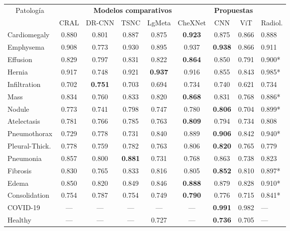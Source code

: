 \begin{table}[tb]
    \centering
    \begin{tabular}{|l||c|c|c|c|c|c|c|l|}
        \hline
        \multicolumn{1}{|c||}{Patología}	&	\multicolumn{5}{c|}{\bf Modelos comparativos}    &\multicolumn{2}{c|}{\bf Propuestas} & 	\\
        \cline{2-9}
                        &	CRAL	&	DR-CNN	&	TSNC	& LgMeta & CheXNet	& CNN	    & ViT & 	Radiol.	\\
        \hline\hline
        Cardiomegaly	&	0.880	&	0.801	&	0.887	&	0.875	&\bf{0.923}	&	0.875	& 0.866 &	0.888	\\
        Emphysema	    &	0.908	&	0.773	&	0.930	&	0.895	&	0.937	&\bf{0.938}	& 0.866 &   0.911	\\
        Effusion	    &	0.829	&	0.797	&	0.831	&	0.822	&\bf{0.864}	&	0.850	& 0.791 &   0.900*	\\
        Hernia	        &	0.917	&	0.748	&	0.921	&\bf{0.937}	&	0.916	&	0.855	& 0.843 &   0.985*	\\
        Infiltration	&	0.702	&\bf{0.751}	&	0.703	&	0.694	&	0.734	&	0.740	& 0.621 &	0.734	\\
        Mass	        &	0.834	&	0.760	&	0.833	&	0.820	&\bf{0.868}	&	0.831	& 0.768 &	0.886*	\\
        Nodule	        &	0.773	&	0.741	&	0.798	&	0.747	&	0.780	&\bf{0.806}	& 0.704 &	0.899*	\\
        Atelectasis	    &	0.781	&	0.766	&	0.785	&	0.763	&\bf{0.809}	&	0.794	& 0.734 &	0.808	\\
        Pneumothorax	&	0.729	&	0.778	&	0.731	&	0.840	&	0.889	&\bf{0.906}	& 0.842 &	0.940*	\\
        Pleural-Thick.	&	0.778	&	0.759	&	0.782	&	0.763	&	0.806	&\bf{0.820}	& 0.765 &	0.779	\\
        Pneumonia	    &	0.857	&	0.800	&\bf{0.881}	&	0.731	&	0.768	&	0.863	& 0.738 &	0.823	\\
        Fibrosis	    &	0.830	&	0.765	&	0.833	&	0.816	&	0.805	&\bf{0.852}	& 0.810 &	0.897*	\\
        Edema	        &	0.850	&	0.820	&	0.849	&	0.846	&\bf{0.888}	&	0.879	& 0.828 &	0.910*	\\
        Consolidation	&	0.754	&	0.787	&	0.754	&	0.749	&\bf{0.790}	&	0.776	& 0.715 &	0.841*	\\
        \hline
        COVID-19	    &	---	    &	---	    &	---	    &	---	    &	---	    &\bf{0.991}	& 0.982 &	---	    \\
        Healthy	        &	---	    &	---	    &	---	    &	0.727	&	---	    &\bf{0.736}	& 0.705 &	---	    \\

\end{tabular}
\end{table}
